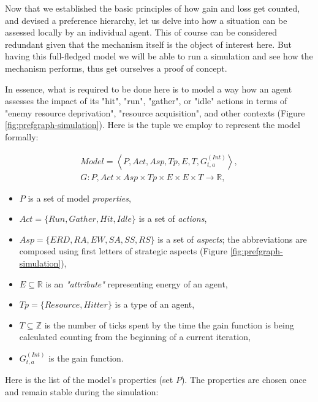 Now that we established the basic principles of how gain and loss get counted, and devised a preference hierarchy, let
us delve into how a situation can be assessed locally by an individual agent. This of course can be considered redundant
given that the mechanism itself is the object of interest here. But having this full-fledged
model we will be able to run a simulation and see how the mechanism performs, thus get ourselves a proof of concept.

In essence, what is required to be done here is to model a way how an agent assesses the impact of its "hit", "run",
"gather", or "idle" actions in terms of "enemy resource deprivation", "resource acquisition", and other contexts (Figure
\ref{fig:prefgraph-simulation}). Here is the tuple we employ to represent the model formally:

\begin{equation}
    \begin{gathered}
        Model = \left< P, Act, Asp, Tp, E, T, G_{t, a}^{(Int)} \right>,\\
        G: P, Act \times Asp \times Tp \times E \times E \times T \rightarrow \mathbb{R},
    \end{gathered}
\end{equation}

\begin{itemize}
    \item $P$ is a set of model \textit{properties},
    \item $Act = \{Run, Gather, Hit, Idle\}$ is a set of \textit{actions},
    \item $Asp = \{ ERD, RA, EW, SA, SS, RS \}$ is a set of \textit{aspects}; the abbreviations are composed using first letters of strategic aspects (Figure \ref{fig:prefgraph-simulation}),
    \item $E \subseteq \mathbb{R}$ is an \textit{"attribute"} representing energy of an agent,
    \item $Tp = \{Resource, Hitter \}$ is a type of an agent,
    \item $T \subseteq \mathbb{Z}$ is the number of ticks spent by the time the gain function is being calculated counting from the beginning of a current iteration,
    \item $G_{t, a}^{(Int)}$ is the gain function.
\end{itemize}

Here is the list of the model's properties (set $P$). The properties are chosen once and remain stable
during the simulation:

